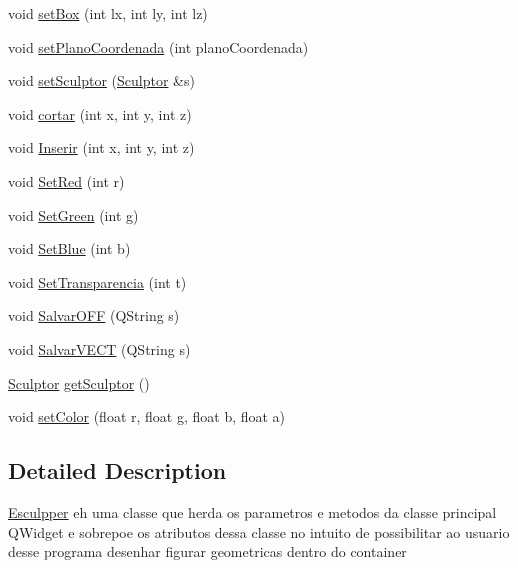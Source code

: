 \begin{DoxyCompactItemize}
\item 
void \mbox{\hyperlink{class_esculpper_aef40ff24714c542d056c772f2da6a06d}{set\+Box}} (int lx, int ly, int lz)
\item 
void \mbox{\hyperlink{class_esculpper_a5d3a9022e6a7e238d7c0d2cc4a3f7ab5}{set\+Plano\+Coordenada}} (int plano\+Coordenada)
\item 
void \mbox{\hyperlink{class_esculpper_a60d29da81456257d8956aa8a49cb65a7}{set\+Sculptor}} (\mbox{\hyperlink{class_sculptor}{Sculptor}} \&s)
\item 
void \mbox{\hyperlink{class_esculpper_ae79b3da4d0b21385d56ca89b4584e802}{cortar}} (int x, int y, int z)
\item 
void \mbox{\hyperlink{class_esculpper_a22f68de687305ed2e9917db6c6959cf4}{Inserir}} (int x, int y, int z)
\item 
void \mbox{\hyperlink{class_esculpper_a839c01344d7da0202eb8cbe81b0e8bfc}{Set\+Red}} (int r)
\item 
void \mbox{\hyperlink{class_esculpper_a94760e2f4d66bd1001a66cf40fcbfe34}{Set\+Green}} (int g)
\item 
void \mbox{\hyperlink{class_esculpper_a7eef082bf1ad9272391b5730b04e3614}{Set\+Blue}} (int b)
\item 
void \mbox{\hyperlink{class_esculpper_a61f1f97e68ffae1aa19b61c18231dce4}{Set\+Transparencia}} (int t)
\item 
void \mbox{\hyperlink{class_esculpper_a1ff4b2f6369e31634e93bd781c8312ce}{Salvar\+O\+FF}} (Q\+String s)
\item 
void \mbox{\hyperlink{class_esculpper_a104883007089b1349d0a74537869ea79}{Salvar\+V\+E\+CT}} (Q\+String s)
\item 
\mbox{\hyperlink{class_sculptor}{Sculptor}} \mbox{\hyperlink{class_esculpper_aa28642864781d77f35236e6504ab3ce0}{get\+Sculptor}} ()
\item 
void \mbox{\hyperlink{class_esculpper_ab833a2dbabd6b574b0883e077ad294e4}{set\+Color}} (float r, float g, float b, float a)
\end{DoxyCompactItemize}


\subsection{Detailed Description}
\mbox{\hyperlink{class_esculpper}{Esculpper}} eh uma classe que herda os parametros e metodos da classe principal Q\+Widget e sobrepoe os atributos dessa classe no intuito de possibilitar ao usuario desse programa desenhar figurar geometricas dentro do container 

